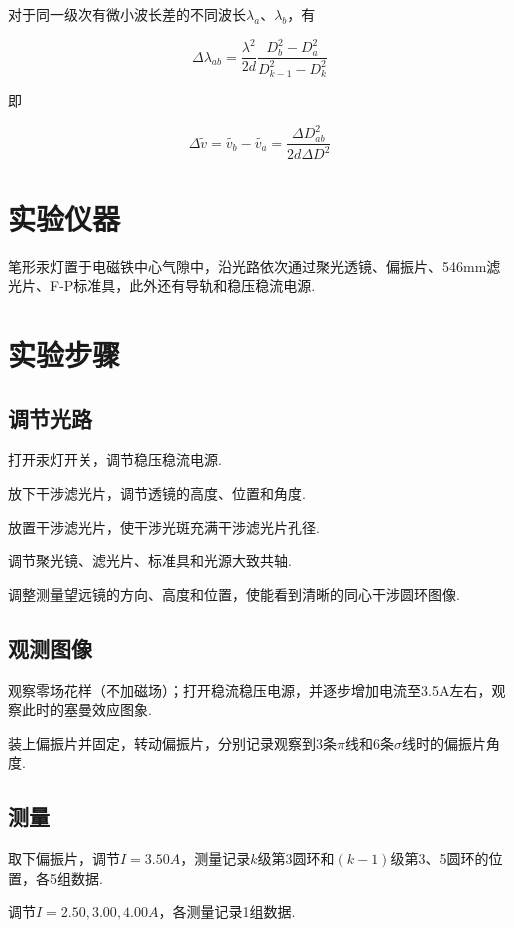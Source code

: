 \documentclass{thureport}
\begin{document}
对于同一级次有微小波长差的不同波长$\lambda_a$、$\lambda_b$，有

$$\Delta \lambda_{ab}=\frac{\lambda^2}{2d}\frac{D_b^2-D_a^2}{D_{k-1}^2-D_k^2}$$

即

$$\Delta \tilde{v}=\tilde{v_b}-\tilde{v_a}=\frac{\Delta D_{ab}^2}{2d\Delta D^2}$$

\section{实验仪器}
笔形汞灯置于电磁铁中心气隙中，沿光路依次通过聚光透镜、偏振片、546mm滤光片、F-P标准具，此外还有导轨和稳压稳流电源.

\section{实验步骤}
\subsection{调节光路}
\begin{clause}
	\item 打开汞灯开关，调节稳压稳流电源.
	\item 放下干涉滤光片，调节透镜的高度、位置和角度.
	\item 放置干涉滤光片，使干涉光斑充满干涉滤光片孔径.
	\item 调节聚光镜、滤光片、标准具和光源大致共轴.
	\item 调整测量望远镜的方向、高度和位置，使能看到清晰的同心干涉圆环图像.
\end{clause}

\subsection{观测图像}
\begin{clause}
	\item 观察零场花样（不加磁场）；打开稳流稳压电源，并逐步增加电流至3.5A左右，观察此时的塞曼效应图象.
	\item 装上偏振片并固定，转动偏振片，分别记录观察到3条$\pi$线和6条$\sigma$线时的偏振片角度.
\end{clause}

\subsection{测量}
\begin{clause}
	\item 取下偏振片，调节$I=3.50A$，测量记录$k$级第3圆环和$(k-1)$级第3、5圆环的位置，各5组数据.
	\item 调节$I=2.50,3.00,4.00A$，各测量记录1组数据.
\end{clause}
\end{document}

